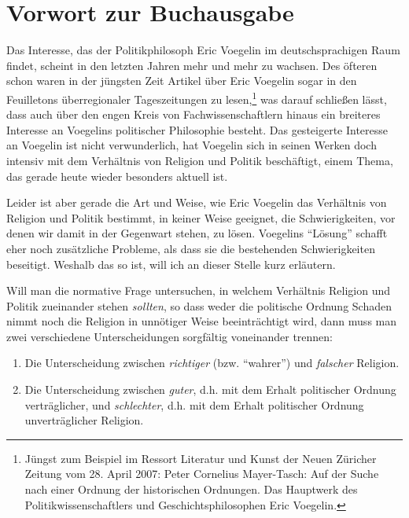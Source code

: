 

\chapter{Vorwort zur Buchausgabe}

Das Interesse, das der Politikphilosoph Eric Voegelin im deutschsprachigen
Raum findet, scheint in den letzten Jahren mehr und mehr zu wachsen. Des
öfteren schon waren in der jüngsten Zeit Artikel über Eric Voegelin sogar in
den Feuilletons überregionaler Tageszeitungen zu lesen,\footnote{Jüngst zum
  Beispiel im Ressort Literatur und Kunst der Neuen Züricher Zeitung vom 28.
  April 2007: Peter Cornelius Mayer-Tasch: Auf der Suche nach einer Ordnung
  der historischen Ordnungen. Das Hauptwerk des Politikwissenschaftlers und
  Geschichtsphilosophen Eric Voegelin.} was darauf schließen lässt, dass auch
über den engen Kreis von Fachwissenschaftlern hinaus ein breiteres Interesse
an Voegelins politischer Philosophie besteht.  Das gesteigerte Interesse an
Voegelin ist nicht verwunderlich, hat Voegelin sich in seinen Werken doch
intensiv mit dem Verhältnis von Religion und Politik beschäftigt, einem Thema,
das gerade heute wieder besonders aktuell ist.

Leider ist aber gerade die Art und Weise, wie Eric Voegelin das Verhältnis von
Religion und Politik bestimmt, in keiner Weise geeignet, die Schwierigkeiten,
vor denen wir damit in der Gegenwart stehen, zu lösen.  Voegelins ``Lösung''
schafft eher noch zusätzliche Probleme, als dass sie die bestehenden
Schwierigkeiten beseitigt. Weshalb das so ist, will ich an dieser Stelle kurz
erläutern.

Will man die normative Frage untersuchen, in welchem Verhältnis Religion und
Politik zueinander stehen {\em sollten}, so dass weder die politische Ordnung
Schaden nimmt noch die Religion in unnötiger Weise beeinträchtigt wird,
dann muss man zwei verschiedene Unterscheidungen sorgfältig voneinander
trennen:

\begin{enumerate}

\item Die Unterscheidung zwischen {\em richtiger} (bzw. "`wahrer"') und {\em
    falscher} Religion.

\item Die Unterscheidung zwischen {\em guter}, d.h. mit dem Erhalt politischer
  Ordnung verträglicher, und {\em schlechter}, d.h. mit dem Erhalt politischer
  Ordnung unverträglicher Religion.

\end{enumerate}

